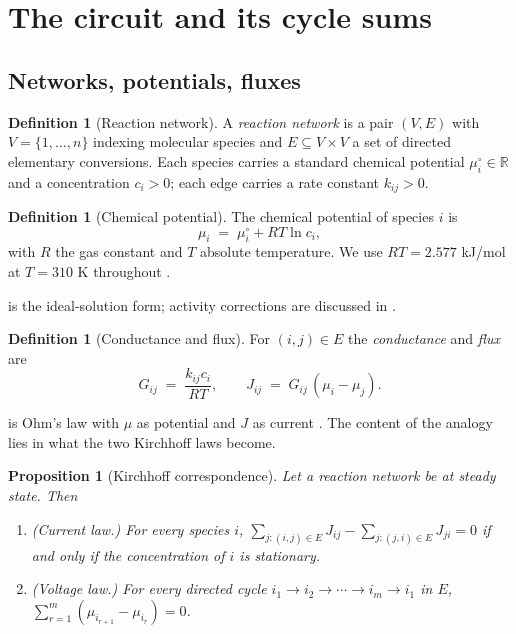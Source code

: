 \documentclass[11pt,twocolumn,a4paper]{article}
\theoremstyle{pstyle}
\newtheorem{proposition}[theorem]{Proposition}
\theoremstyle{definition}
\newtheorem{definition}[theorem]{Definition}
\theoremstyle{remark}
\newcommand{\R}{\mathbb{R}}
\begin{document}
\section{The circuit and its cycle sums}
\label{sec:circuit}

\subsection{Networks, potentials, fluxes}

\begin{definition}[Reaction network]
\label{def:network}
A \emph{reaction network} is a pair $(V,E)$ with $V=\{1,\dots,n\}$
indexing molecular species and $E \subseteq V\times V$ a set of directed
elementary conversions. Each species carries a standard chemical
potential $\mu_i^{\circ}\in\R$ and a concentration $c_i>0$; each edge
carries a rate constant $k_{ij}>0$.
\end{definition}

\begin{definition}[Chemical potential]
\label{def:mu}
The chemical potential of species $i$ is
\begin{equation}
  \mu_i \;=\; \mu_i^{\circ} + RT\ln c_i,
  \label{eq:mu}
\end{equation}
with $R$ the gas constant and $T$ absolute temperature. We use
$RT=2.577$ kJ/mol at $T=310$ K throughout \citep{atkins2018}.
\end{definition}

 is the ideal-solution form; activity corrections are
discussed in .

\begin{definition}[Conductance and flux]
\label{def:conductance}
For $(i,j)\in E$ the \emph{conductance} and \emph{flux} are
\begin{equation}
  G_{ij} \;=\; \frac{k_{ij}c_i}{RT},
  \qquad
  J_{ij} \;=\; G_{ij}\,(\mu_i - \mu_j).
  \label{eq:GJ}
\end{equation}
\end{definition}

 is Ohm's law with $\mu$ as potential and $J$ as current
\citep{oster1971,beard2002,qian2005}. The content of the analogy lies in
what the two Kirchhoff laws become.

\begin{proposition}[Kirchhoff correspondence]
\label{prop:kirchhoff}
Let a reaction network be at steady state. Then
\begin{enumerate}[label=(\roman*),leftmargin=2em,itemsep=2pt]
\item \emph{(Current law.)} For every species $i$,
$\sum_{j:(i,j)\in E} J_{ij} - \sum_{j:(j,i)\in E} J_{ji} = 0$ if and
only if the concentration of $i$ is stationary.
\item \emph{(Voltage law.)} For every directed cycle
$i_1\to i_2\to\cdots\to i_m\to i_1$ in $E$,
$\sum_{r=1}^{m}(\mu_{i_{r+1}}-\mu_{i_r}) = 0$.
\end{enumerate}
\end{proposition}
\end{document}
